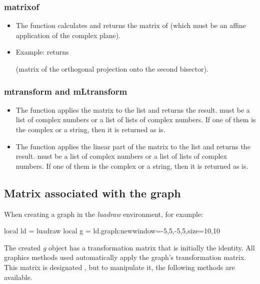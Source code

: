 \subsubsection{matrixof}
\begin{itemize}
    \item The function  calculates and returns the matrix of  (which must be an affine application of the complex plane).
    \item Example:  returns \par
{} (matrix of the orthogonal projection onto the second bisector).
\end{itemize}

\subsubsection{mtransform and mLtransform}
\begin{itemize}
    \item The function  applies the matrix  to the list  and returns the result.  must be a list of complex numbers or a list of lists of complex numbers. If one of them is the complex  or a string, then it is returned as is.

    \item The function  applies the linear part of the matrix  to the list  and returns the result.  must be a list of complex numbers or a list of lists of complex numbers. If one of them is the complex  or a string, then it is returned as is.
\end{itemize}

\subsection{Matrix associated with the graph}

When creating a graph in the \emph{luadraw} environment, for example:
\begin{Luacode}
local ld = luadraw
local g = ld.graph:new{window={-5,5,-5,5},size={10,10}}
\end{Luacode}
The created \emph{g} object has a transformation matrix that is initially the identity. All graphics methods used automatically apply the graph's transformation matrix. This matrix is ​​designated , but to manipulate it, the following methods are available.

